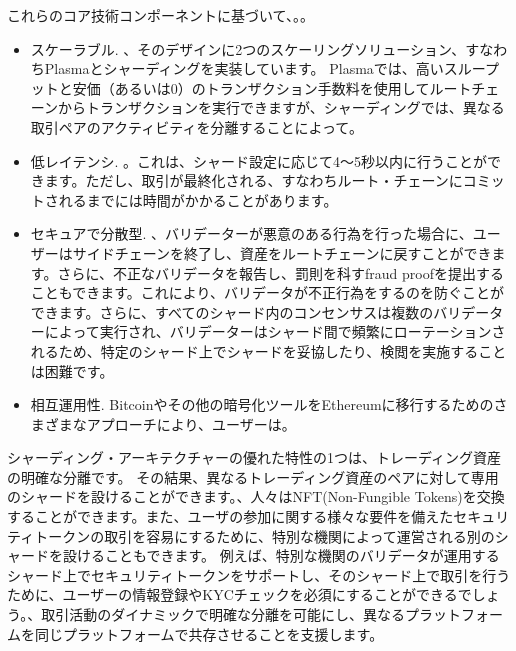 これらのコア技術コンポーネントに基づいて、。。

\begin{itemize}
\item スケーラブル. 、そのデザインに2つのスケーリングソリューション、すなわちPlasmaとシャーディングを実装しています。 Plasmaでは、高いスループットと安価（あるいは0）のトランザクション手数料を使用してルートチェーンからトランザクションを実行できますが、シャーディングでは、異なる取引ペアのアクティビティを分離することによって。
\item 低レイテンシ. 。これは、シャード設定に応じて4〜5秒以内に行うことができます。ただし、取引が最終化される、すなわちルート・チェーンにコミットされるまでには時間がかかることがあります。
\item セキュアで分散型. 、バリデーターが悪意のある行為を行った場合に、ユーザーはサイドチェーンを終了し、資産をルートチェーンに戻すことができます。さらに、不正なバリデータを報告し、罰則を科すfraud proofを提出することもできます。これにより、バリデータが不正行為をするのを防ぐことができます。さらに、すべてのシャード内のコンセンサスは複数のバリデーターによって実行され、バリデーターはシャード間で頻繁にローテーションされるため、特定のシャード上でシャードを妥協したり、検閲を実施することは困難です。
\item 相互運用性. Bitcoinやその他の暗号化ツールをEthereumに移行するためのさまざまなアプローチにより、ユーザーは。
\end{itemize}

シャーディング・アーキテクチャーの優れた特性の1つは、トレーディング資産の明確な分離です。 その結果、異なるトレーディング資産のペアに対して専用のシャードを設けることができます。、人々はNFT(Non-Fungible Tokens)を交換することができます。また、ユーザの参加に関する様々な要件を備えたセキュリティトークンの取引を容易にするために、特別な機関によって運営される別のシャードを設けることもできます。 例えば、特別な機関のバリデータが運用するシャード上でセキュリティトークンをサポートし、そのシャード上で取引を行うために、ユーザーの情報登録やKYCチェックを必須にすることができるでしょう。、取引活動のダイナミックで明確な分離を可能にし、異なるプラットフォームを同じプラットフォームで共存させることを支援します。

